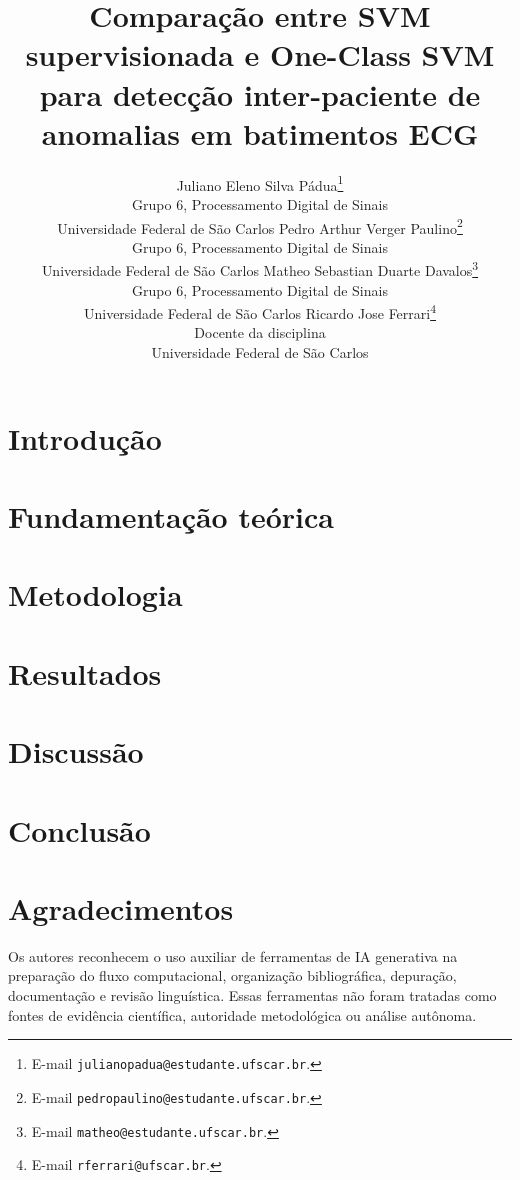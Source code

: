 \documentclass{article}
\title{Comparação entre SVM supervisionada e One-Class SVM para detecção inter-paciente de anomalias em batimentos ECG}
\author{
  Juliano Eleno Silva Pádua\thanks{E-mail \texttt{julianopadua@estudante.ufscar.br}.}\\
  Grupo 6, Processamento Digital de Sinais\\
  Universidade Federal de São Carlos
  \And
  Pedro Arthur Verger Paulino\thanks{E-mail \texttt{pedropaulino@estudante.ufscar.br}.}\\
  Grupo 6, Processamento Digital de Sinais\\
  Universidade Federal de São Carlos
  \And
  Matheo Sebastian Duarte Davalos\thanks{E-mail \texttt{matheo@estudante.ufscar.br}.}\\
  Grupo 6, Processamento Digital de Sinais\\
  Universidade Federal de São Carlos
  \AND
  Ricardo Jose Ferrari\thanks{E-mail \texttt{rferrari@ufscar.br}.}\\
  Docente da disciplina\\
  Universidade Federal de São Carlos
}
\begin{document}
\maketitle

\begin{abstract}

\end{abstract}

\section{Introdução}


\section{Fundamentação teórica}


\section{Metodologia}



\section{Resultados}


\section{Discussão}


\section{Conclusão}


\section*{Agradecimentos}

Os autores reconhecem o uso auxiliar de ferramentas de IA generativa na
preparação do fluxo computacional, organização bibliográfica, depuração,
documentação e revisão linguística. Essas ferramentas não foram tratadas como
fontes de evidência científica, autoridade metodológica ou análise autônoma.


\end{document}
